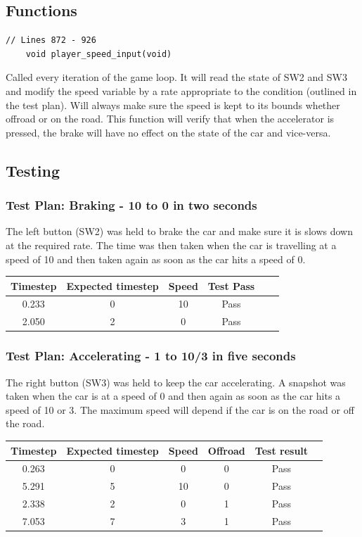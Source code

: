 \documentclass{article}
\begin{document}
\subsection*{Functions}
\begin{lstlisting}[style=CStyle]
	// Lines 872 - 926
	void player_speed_input(void)
\end{lstlisting}
Called every iteration of the game loop. It will read the state of SW2 and SW3 and modify the speed variable by a rate appropriate to the condition (outlined in the test plan). Will always make sure the speed is kept to its bounds whether offroad or on the road. This function will verify that when the accelerator is pressed, the brake will have no effect on the state of the car and vice-versa. 
\newline

\subsection*{Testing}
\subsubsection*{Test Plan: Braking - 10 to 0 in two seconds}
The left button (SW2) was held to brake the car and make sure it is slows down at the required rate. The time was then taken when the car is travelling at a speed of 10 and then taken again as soon as the car hits a speed of 0.
\begin{center}
\begin{tabular}{ c c c c c c }
Timestep	& Expected timestep	& Speed	& Test Pass	\\ \hline
0.233		& 0				& 10		& Pass	\\
2.050		& 2				& 0		& Pass 	\\ \hline
\end{tabular}
\end{center}

\subsubsection*{Test Plan: Accelerating - 1 to 10/3 in five seconds}
The right button (SW3) was held to keep the car accelerating. A snapshot was taken when the car is at a speed of 0 and then again as soon as the car hits a speed of 10 or 3. The maximum speed will depend if the car is on the road or off the road.
\begin{center}
\begin{tabular}{ c c c c c c }
Timestep	& Expected timestep	& Speed	& Offroad	& Test result	\\ \hline
0.263		& 0 				& 0		& 0		& Pass	\\
5.291		& 5				& 10		& 0		& Pass	\\
2.338		& 2				& 0		& 1		& Pass	\\
7.053		& 7				& 3		& 1		& Pass	\\ \hline
\end{tabular}
\end{center}
\end{document}
